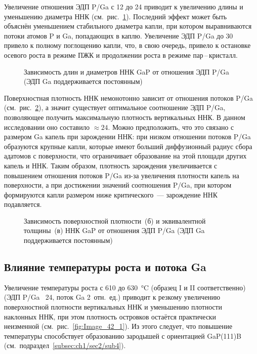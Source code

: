 Увеличение отношения ЭДП P/Ga с 12 до 24 приводит к увеличению длины и
уменьшению диаметра ННК (см.~рис.~\cref{fig:Image_41_1}). Последний эффект
может быть объяснён уменьшением стабильного диаметра капли, при котором
выравниваются потоки атомов P и Ga, попадающих в каплю. Увеличение ЭДП P/Ga до
30 привело к полному поглощению капли, что, в свою очередь, привело к остановке
осевого роста в режиме ПЖК и продолжении роста в режиме пар\,--\,кристалл.

\begin{figure}[ht]  \caption{Зависимость длин и
диаметров ННК GaP от отношения ЭДП P/Ga (ЭДП Ga поддерживается
постоянным)}\label{fig:Image_41_1} \end{figure}

Поверхностная плотность ННК немонотонно зависит от отношения потоков P/Ga
(см.~рис.~\cref{fig:Image_41_23}), а значит существует оптимальное соотношение
ЭДП P/Ga, позволяющее получить максимальную плотность вертикальных ННК. В
данном исследовании оно составило \(\approx 24\). Можно предположить, что это
связано с размером Ga капель при зарождении ННК: при низком отношении потоков
P/Ga образуются крупные капли, которые имеют больший диффузионный радиус сбора
адатомов с поверхности, что ограничивает образование на этой площади других
капель и ННК. Таким образом, плотность зарождения увеличивается с повышением
отношения потоков P/Ga из-за увеличения плотности капель на поверхности, а при
достижении значений соотношения P/Ga, при котором формируются капли размером
ниже критического~--- зарождение ННК подавляется.

\begin{figure}[ht] 
			\caption{Зависимость поверхностной плотности~(б) и эквивалентной
		толщины~(в) ННК GaP от отношения ЭДП P/Ga (ЭДП Ga поддерживается
постоянным)}\label{fig:Image_41_23} \end{figure}

\subsection{Влияние температуры роста и потока Ga}\label{subsec:ch6/sec2/sub4}

Увеличение температуры роста с 610 до 630~\si{\degreeCelsius} (образец I и II
соответственно) (ЭДП P/Ga ~24, поток Ga 2~отн.~ед.) приводит к резкому
увеличению поверхностной плотности вертикальных ННК и уменьшению плотности
наклонных ННК, при этом плотность островков остаётся практически неизменной
(см.~рис.~\cref{fig:Image_42_1}). Из этого следует, что повышение температуры
способствует образованию зародышей с ориентацией GaP(111)B
(см.~подраздел~\cref{subsec:ch1/sec2/sub4}).

